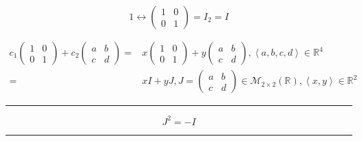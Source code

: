 \documentclass[
]{book}
\theoremstyle{definition}
\theoremstyle{definition}
\theoremstyle{definition}
\theoremstyle{definition}
\theoremstyle{remark}
\begin{document}
\[
1\leftrightarrow\begin{pmatrix}1 & 0\\
0 & 1
\end{pmatrix}=I_{2}=I
\]

\[
\begin{aligned}
c_{{\scriptscriptstyle 1}}\begin{pmatrix}1 & 0\\
0 & 1
\end{pmatrix}+c_{{\scriptscriptstyle 2}}\begin{pmatrix}a & b\\
c & d
\end{pmatrix}= & x\begin{pmatrix}1 & 0\\
0 & 1
\end{pmatrix}+y\begin{pmatrix}a & b\\
c & d
\end{pmatrix},\left\langle a,b,c,d\right\rangle \in\mathbb{R}^{4}\\
= & xI+yJ,J=\begin{pmatrix}a & b\\
c & d
\end{pmatrix}\in\mathcal{M}_{2\times2}\left(\mathbb{R}\right),\left\langle x,y\right\rangle \in\mathbb{R}^{2}
\end{aligned}
\]

\begin{center}\rule{0.5\linewidth}{0.5pt}\end{center}

\[
J^{2}=-I
\]

\begin{center}\rule{0.5\linewidth}{0.5pt}\end{center}
\end{document}
